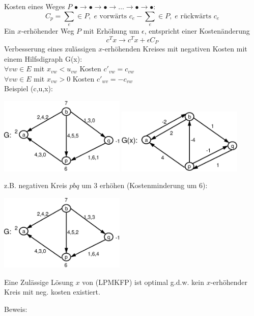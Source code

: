 Kosten eines Weges $P$ $\bullet\rightarrow\bullet\rightarrow\bullet
\rightarrow\ldots \rightarrow\bullet\rightarrow\bullet$:
\[C_{p} = \sum_e \in P, \; e \mbox{ vorwärts } c_{e} -  \sum_e \in P, \; e
\mbox{ rückwärts } c_{e}\]
Ein $x$-erhöhender Weg $P$ mit Erhöhung um $\epsilon$, entspricht einer
Kostenänderung 
\[c^{T}x \rightarrow c^{T}x + \epsilon C_{P}\]
Verbesserung eines zulässigen $x$-erhöhenden Kreises mit negativen
Kosten mit einem Hilfsdigraph G(x):\\
$\forall vw \in E$ mit $x_{vw} < u_{vw}$ Kosten $c'_{vw} = c_{vw}$\\
$\forall vw \in E$ mit $x_{vw} > 0 $ Kosten $c'_{wv} = - c_{vw}$\\
Beispiel (c,u,x):

\includegraphics[width=6cm]{bilder/4-1Hilfsdigr1} \hspace{1cm} 
\includegraphics[width=6cm]{bilder/4-1Hilfsdigr2}

z.B. negativen Kreis $p b q$ um 3 erhöhen (Kostenminderung um 6):

\includegraphics[width=6cm]{bilder/4-1Hilfsdigr3}

\begin{satz} \label{LösungLPMKFPopt}
Eine Zulässige Lösung $x$ von (LPMKFP) ist optimal g.d.w. kein
$x$-erhöhender Kreis mit neg. kosten existiert.
\end{satz}

Beweis:

